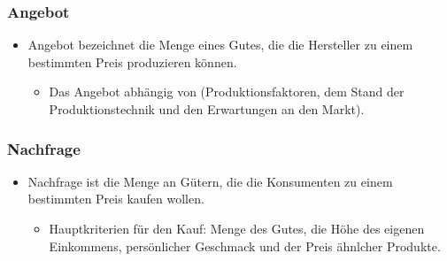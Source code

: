 \documentclass{beamer}
\begin{document}
\begin{frame}
\frametitle{Angebot}
  \begin{itemize}
    \item
Angebot bezeichnet die Menge eines Gutes, die die
Hersteller zu einem bestimmten Preis produzieren
können.
      \begin{itemize}
        \item
  Das Angebot abhängig von (Produktionsfaktoren, dem Stand
  der Produktionstechnik und den Erwartungen an den Markt).
      \end{itemize}
  \end{itemize}
\end{frame}

\begin{frame}
\frametitle{Nachfrage}
  \begin{itemize}
    \item
Nachfrage ist die Menge an Gütern, die die
Konsumenten zu einem bestimmten Preis kaufen wollen.

      \begin{itemize}
        \item
Hauptkriterien für den Kauf: Menge des Gutes, die Höhe des
eigenen Einkommens, persönlicher Geschmack und der Preis ähnlcher
Produkte.
      \end{itemize}
  \end{itemize}
\end{frame}
\end{document}
